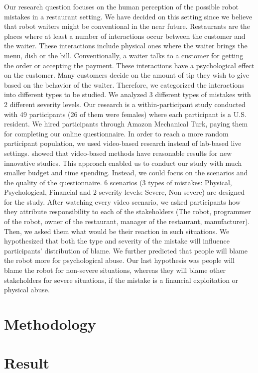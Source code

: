 \documentclass{sigchi}
\begin{document}
Our research question focuses on the human perception of the possible robot mistakes in a restaurant setting. We have decided on this setting since we believe that robot waiters might be conventional in the near future. Restaurants are the places where at least a number of interactions occur between the customer and the waiter. These interactions include physical ones where the waiter brings the menu, dish or the bill. Conventionally, a waiter talks to a customer for getting the order or accepting the payment. These interactions have a psychological effect on the customer. Many customers decide on the amount of tip they wish to give based on the behavior of the waiter. Therefore, we categorized the interactions into different types to be studied.  We analyzed 3 different types of mistakes with 2 different severity levels. Our research is a within-participant study conducted with 49 participants (26 of them were females) where each participant is a U.S. resident. We hired participants through Amazon Mechanical Turk, paying them for completing our online questionnaire. In order to reach a more random participant population, we used video-based research instead of lab-based live settings. \cite{woods2006comparing} showed that video-based methods have reasonable results for new innovative studies. This approach enabled us to conduct our study with much smaller budget and time spending. Instead, we could focus on the scenarios and the quality of the questionnaire. 6 scenarios (3 types of mistakes: Physical, Psychological, Financial and 2 severity levels: Severe, Non severe) are designed for the study. After watching every video scenario, we asked participants how they attribute responsibility to each of the stakeholders (The robot, programmer of the robot, owner of the restaurant, manager of the restaurant, manufacturer). Then, we asked them what would be their reaction in such situations. We hypothesized that both the type and severity of the mistake will influence participants' distribution of blame. We further predicted that people will blame the robot more for psychological abuse. Our last hypothesis was people will blame the robot for non-severe situations, whereas they will blame other stakeholders for severe situations, if the mistake is a financial exploitation or physical abuse.

\section{Methodology}
\section{Result}
\end{document}
